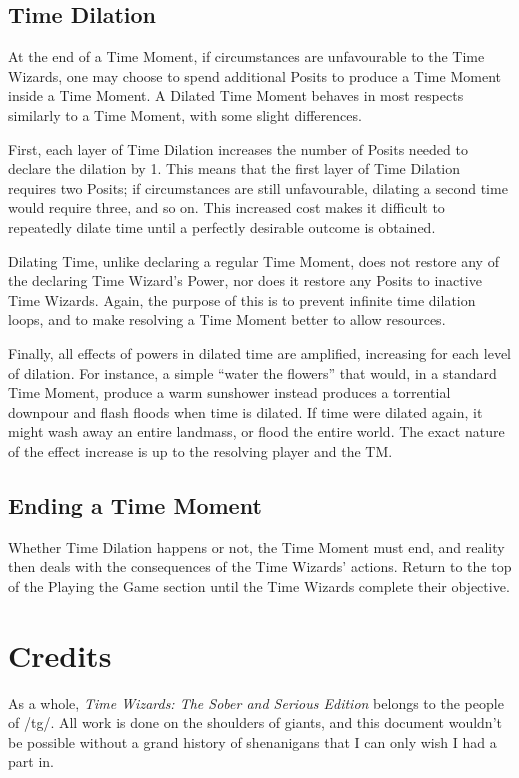 \documentclass[twoside]{article}
\newcommand{\twsse}{\emph{Time Wizards: The Sober and Serious Edition}}
\begin{document}
\subsection{Time Dilation} \label{ssec:time-dilation}
At the end of a Time Moment, if circumstances are unfavourable to the Time Wizards, one may
choose to spend additional Posits to produce a Time Moment inside a Time Moment. A Dilated Time
Moment behaves in most respects similarly to a Time Moment, with some slight differences.

First, each layer of Time Dilation increases the number of Posits needed to declare the dilation
by 1. This means that the first layer of Time Dilation requires two Posits; if circumstances are
still unfavourable, dilating a second time would require three, and so on. This increased cost
makes it difficult to repeatedly dilate time until a perfectly desirable outcome is obtained.

Dilating Time, unlike declaring a regular Time Moment, does not restore any of the declaring
Time Wizard's Power, nor does it restore any Posits to inactive Time Wizards. Again, the purpose
of this is to prevent infinite time dilation loops, and to make resolving a Time Moment better
to allow resources.

Finally, all effects of powers in dilated time are amplified, increasing for each level of
dilation. For instance, a simple ``water the flowers'' that would, in a standard Time Moment,
produce a warm sunshower instead produces a torrential downpour and flash floods when time is
dilated. If time were dilated again, it might wash away an entire landmass, or flood the entire
world. The exact nature of the effect increase is up to the resolving player and the TM.

\subsection{Ending a Time Moment} \label{ssec:end-moment}
Whether Time Dilation happens or not, the Time Moment must end, and reality then deals with the
consequences of the Time Wizards' actions. Return to the top of the Playing the Game section
until the Time Wizards complete their objective.

\section{Credits}
As a whole, \twsse{} belongs to the people of /tg/. All work is done on the shoulders of giants,
and this document wouldn't be possible without a grand history of shenanigans that I can only
wish I had a part in.
\end{document}
